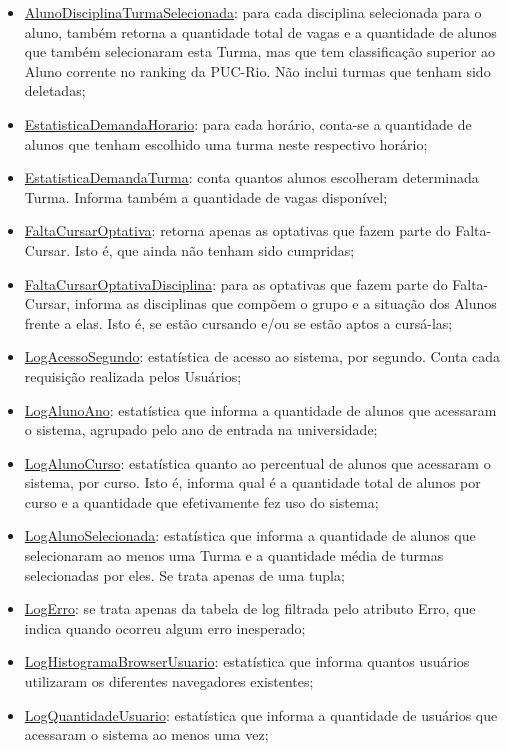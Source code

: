 \documentclass[graduacao,brazil]{ThesisPUC}
\begin{document}
\begin{itemize}
	\item \underline{AlunoDisciplinaTurmaSelecionada}: para cada disciplina selecionada para o aluno, também retorna a quantidade total de vagas e a quantidade de alunos que também selecionaram esta Turma, mas que tem classificação superior ao Aluno corrente no ranking da PUC-Rio. Não inclui turmas que tenham sido deletadas;
	\item \underline{EstatisticaDemandaHorario}: para cada horário, conta-se a quantidade de alunos que tenham escolhido uma turma neste respectivo horário;
	\item \underline{EstatisticaDemandaTurma}: conta quantos alunos escolheram determinada Turma. Informa também a quantidade de vagas disponível;
	\item \underline{FaltaCursarOptativa}: retorna apenas as optativas que fazem parte do Falta-Cursar. Isto é, que ainda não tenham sido cumpridas;
	\item \underline{FaltaCursarOptativaDisciplina}: para as optativas que fazem parte do Falta-Cursar, informa as disciplinas que compõem o grupo e a situação dos Alunos frente a elas. Isto é, se estão cursando e/ou se estão aptos a cursá-las;
	\item \underline{LogAcessoSegundo}: estatística de acesso ao sistema, por segundo. Conta cada requisição realizada pelos Usuários;
	\item \underline{LogAlunoAno}: estatística que informa a quantidade de alunos que acessaram o sistema, agrupado pelo ano de entrada na universidade;
	\item \underline{LogAlunoCurso}: estatística quanto ao percentual de alunos que acessaram o sistema, por curso. Isto é, informa qual é a quantidade total de alunos por curso e a quantidade que efetivamente fez uso do sistema;
	\item \underline{LogAlunoSelecionada}: estatística que informa a quantidade de alunos que selecionaram ao menos uma Turma e a quantidade média de turmas selecionadas por eles. Se trata apenas de uma tupla;
	\item \underline{LogErro}: se trata apenas da tabela de log filtrada pelo atributo Erro, que indica quando ocorreu algum erro inesperado;
	\item \underline{LogHistogramaBrowserUsuario}: estatística que informa quantos usuários utilizaram os diferentes navegadores existentes;
	\item \underline{LogQuantidadeUsuario}: estatística que informa a quantidade de usuários que acessaram o sistema ao menos uma vez;

\end{itemize}
\end{document}
